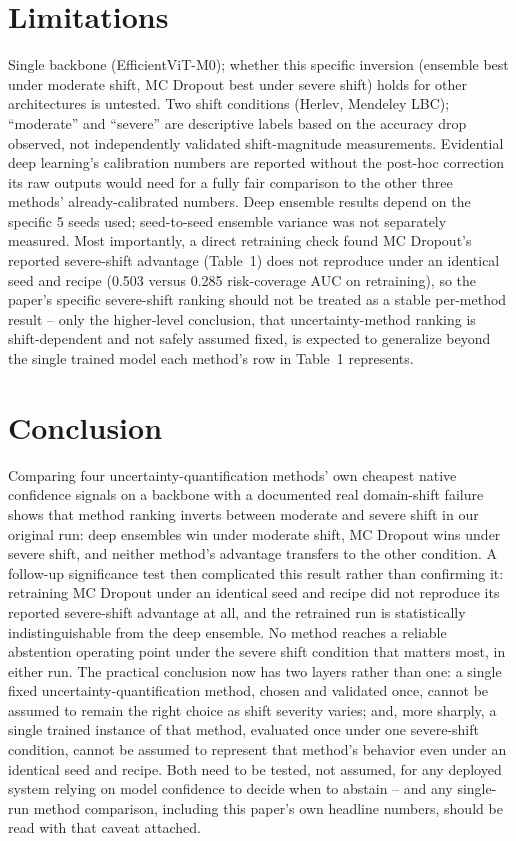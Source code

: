 \documentclass[runningheads]{llncs}
\begin{document}
\section{Limitations}

Single backbone (EfficientViT-M0); whether this specific inversion
(ensemble best under moderate shift, MC Dropout best under severe shift)
holds for other architectures is untested. Two shift conditions (Herlev,
Mendeley LBC); ``moderate'' and ``severe'' are descriptive labels based on
the accuracy drop observed, not independently validated shift-magnitude
measurements. Evidential deep learning's calibration numbers are reported
without the post-hoc correction its raw outputs would need for a fully
fair comparison to the other three methods' already-calibrated numbers.
Deep ensemble results depend on the specific 5 seeds used; seed-to-seed
ensemble variance was not separately measured. Most importantly, a direct
retraining check found MC Dropout's reported severe-shift advantage
(Table~1) does not reproduce under an identical seed and recipe (0.503
versus 0.285 risk-coverage AUC on retraining), so the paper's specific
severe-shift ranking should not be treated as a stable per-method result
-- only the higher-level conclusion, that uncertainty-method ranking is
shift-dependent and not safely assumed fixed, is expected to generalize
beyond the single trained model each method's row in Table~1 represents.

\section{Conclusion}

Comparing four uncertainty-quantification methods' own cheapest native
confidence signals on a backbone with a documented real domain-shift
failure shows that method ranking inverts between moderate and severe
shift in our original run: deep ensembles win under moderate shift, MC
Dropout wins under severe shift, and neither method's advantage transfers
to the other condition. A follow-up significance test then complicated
this result rather than confirming it: retraining MC Dropout under an
identical seed and recipe did not reproduce its reported severe-shift
advantage at all, and the retrained run is statistically indistinguishable
from the deep ensemble. No method reaches a reliable abstention operating
point under the severe shift condition that matters most, in either run.
The practical conclusion now has two layers rather than one: a single
fixed uncertainty-quantification method, chosen and validated once, cannot
be assumed to remain the right choice as shift severity varies; and, more
sharply, a single trained instance of that method, evaluated once under
one severe-shift condition, cannot be assumed to represent that method's
behavior even under an identical seed and recipe. Both need to be tested,
not assumed, for any deployed system relying on model confidence to
decide when to abstain -- and any single-run method comparison, including
this paper's own headline numbers, should be read with that caveat
attached.
\end{document}
